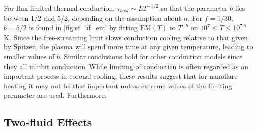 \documentclass[]{aastex}
\begin{document}
	\par For flux-limited thermal conduction, $\tau_{cool} \sim LT^{-1/2}$ so that the parameter $b$ lies between 1/2 and 5/2, depending on the assumption about $n$. For $f = 1/30$, $b = 5/2$ is found in \autoref{fig:sf_hf_em} by fitting $\mathrm{EM}(T)$ to $T^{-b}$ on $10^7\le T\le10^{7.5}$ K. Since the free-streaming limit slows conduction cooling relative to that given by Spitzer, the plasma will spend more time at any given temperature, leading to smaller values of $b$. Similar conclusions hold for other conduction models \citep[e.g. the non-local model discussed in the coronal context by][]{karpen_nonlocal_1987,west_lifetime_2008} since they all inhibit conduction. While limiting of conduction is often regarded as an important process in coronal cooling, these results suggest that for nanoflare heating it may not be that important unless extreme values of the limiting parameter are used. Furthermore, 
	\subsection{Two-fluid Effects}
	\label{subsec:two_fluid_res}
\end{document}
